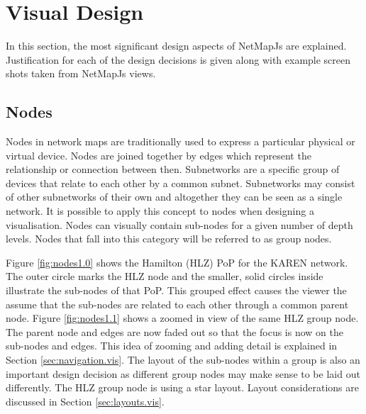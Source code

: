 \documentclass[11pt, a4paper]{article}
\begin{document}
\newpage

\section{Visual Design} 
\label{sec:visual-design}

In this section, the most significant design aspects of NetMapJs are explained.
Justification for each of the design decisions is given along with example
screen shots taken from NetMapJs views.

\subsection{Nodes}
\label{sec:nodes.vis}


Nodes in network maps are traditionally used to express a particular physical or
virtual device. Nodes are joined together by edges which represent the
relationship or connection between then. Subnetworks are a specific group of
devices that relate to each other by a common subnet. Subnetworks may consist of
other subnetworks of their own and altogether they can be seen as a single
network. It is possible to apply this concept to nodes when designing a
visualisation. Nodes can visually contain sub-nodes for a given number
of depth levels. Nodes that fall into this category will be referred to as
group nodes.

Figure \ref{fig:nodes1.0} shows the Hamilton (HLZ) PoP for the KAREN network.
The outer circle marks the HLZ node and the smaller, solid circles inside
illustrate the sub-nodes of that PoP. This grouped effect causes the viewer the
assume that the sub-nodes are related to each other through a common parent
node. Figure \ref{fig:nodes1.1} shows a zoomed in view of the same HLZ group
node. The parent node and edges are now faded out so that the focus is now on
the sub-nodes and edges. This idea of zooming and adding detail is explained in
Section \ref{sec:navigation.vis}. The layout of the sub-nodes within a group is
also an important design decision as different group nodes may make sense to be
laid out differently. The HLZ group node is using a star layout. Layout
considerations are discussed in Section \ref{sec:layouts.vis}.
\end{document}
